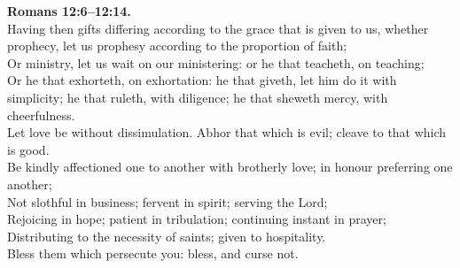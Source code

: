 \documentclass[10pt]{article} %
\begin{document}
{\begin{minipage}[t]{0.45\textwidth}
\textbf{Romans 12:6--12:14.}\\
Having then gifts differing according to the grace that is given to us, whether prophecy, let us prophesy according to the proportion of faith;\\
Or ministry, let us wait on our ministering: or he that teacheth, on teaching;\\
Or he that exhorteth, on exhortation: he that giveth, let him do it with simplicity; he that ruleth, with diligence; he that sheweth mercy, with cheerfulness.\\
Let love be without dissimulation. Abhor that which is evil; cleave to that which is good.\\
Be kindly affectioned one to another with brotherly love; in honour preferring one another;\\
Not slothful in business; fervent in spirit; serving the Lord;\\
Rejoicing in hope; patient in tribulation; continuing instant in prayer;\\
Distributing to the necessity of saints; given to hospitality.\\
Bless them which persecute you: bless, and curse not.\\

\end{minipage}}
\vspace*{\fill}
\newpage
\Huge%
\vspace*{\fill}
\begin{spacing}{1.45}%
\end{spacing}
\vspace*{\fill}
\end{document}

